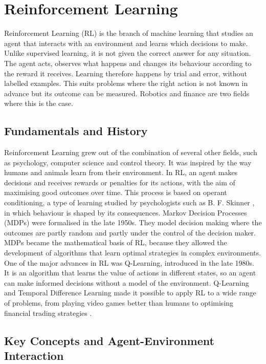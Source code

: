 \section{Reinforcement Learning}
\label{Section:ReinforcementLearning}

Reinforcement Learning (RL) is the branch of machine learning that studies an agent that interacts with an environment and learns which decisions to make. Unlike supervised learning, it is not given the correct answer for any situation. The agent acts, observes what happens and changes its behaviour according to the reward it receives. Learning therefore happens by trial and error, without labelled examples. This suits problems where the right action is not known in advance but its outcome can be measured. Robotics and finance are two fields where this is the case.

\subsection{Fundamentals and History}

Reinforcement Learning grew out of the combination of several other fields, such as psychology, computer science and control theory. It was inspired by the way humans and animals learn from their environment. In RL, an agent makes decisions and receives rewards or penalties for its actions, with the aim of maximising good outcomes over time. This process is based on operant conditioning, a type of learning studied by psychologists such as B. F. Skinner \cite{skinner_operant_1963}, in which behaviour is shaped by its consequences. Markov Decision Processes (MDPs) were formalised in the late 1950s. They model decision making where the outcomes are partly random and partly under the control of the decision maker. MDPs became the mathematical basis of RL, because they allowed the development of algorithms that learn optimal strategies in complex environments. One of the major advances in RL was Q-Learning, introduced in the late 1980s. It is an algorithm that learns the value of actions in different states, so an agent can make informed decisions without a model of the environment. Q-Learning and Temporal Difference Learning made it possible to apply RL to a wide range of problems, from playing video games better than humans to optimising financial trading strategies \cite{sutton_reinforcement_2018}.

\subsection{Key Concepts and Agent-Environment Interaction}

